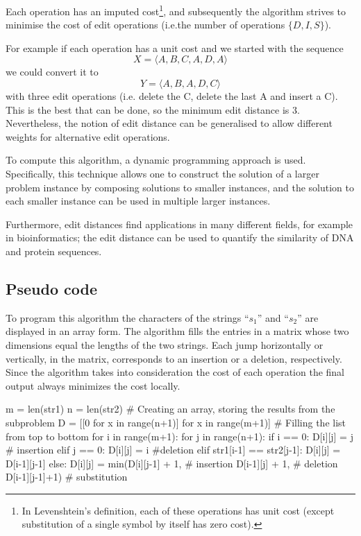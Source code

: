 \documentclass[12pt, authoryear]{elsarticle}
\begin{document}
Each operation has an imputed cost\footnote{In Levenshtein's  definition, each of these operations has unit cost (except substitution of a single symbol by itself has zero cost).}, and subsequently the algorithm strives to minimise the cost of edit operations (i.e.the  number of operations $\{ D, I, S \}$).

For example if each operation has a unit cost and we started with the sequence
\[  X = \langle A , B , C , A , D , A \rangle  \]
we could convert it to
\[ Y = \langle A , B , A , D , C \rangle \]
with three edit operations (i.e. delete the C, delete the last A and insert a C). This is the best that can be done, so the minimum edit distance is 3.  Nevertheless, the notion of edit distance can be generalised to allow different weights for alternative edit operations. 

To compute this algorithm, a dynamic programming approach is used. Specifically, this technique allows one to construct the solution of a larger problem instance by composing solutions to smaller instances, and the solution to each smaller instance can be used in multiple larger instances\citep{Agrawal}.

Furthermore, edit distances find applications in many different fields, for example in bioinformatics; the edit distance can be used to quantify the similarity of DNA and protein sequences.

\subsection{Pseudo code }

To program this algorithm the characters of the strings “$s_1$” and “$s_2$” are displayed in an array form. The algorithm fills the entries in a matrix whose two dimensions equal the lengths of the two strings\citep{editdistance}. Each jump horizontally or vertically, in the matrix, corresponds to an insertion or a deletion, respectively. Since the algorithm takes into consideration the cost of each operation the final output always minimizes the cost locally. \\

\begin{python}
m = len(str1)
n = len(str2)
# Creating an array, storing the results from the subproblem
D = [[0 for x in range(n+1)] for x in range(m+1)] 
  # Filling the list from top to bottom 
  for i in range(m+1): 
    for j in range(n+1): 
       if i == 0: 
         D[i][j] = j  # insertion  
       elif j == 0: 
         D[i][j] = i    #deletion
       elif str1[i-1] == str2[j-1]: 
         D[i][j] = D[i-1][j-1] 
       else: 
         D[i][j] = min(D[i][j-1] + 1, # insertion     
           D[i-1][j] + 1,   # deletion
           D[i-1][j-1]+1) # substitution
	
\end{python}
\end{document}
